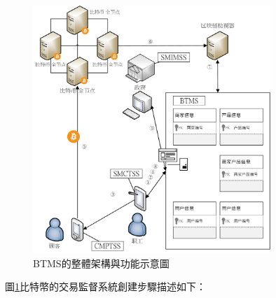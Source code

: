 	\begin{figure}[!htbp]
		\centering
		\includegraphics[width = 0.8\textwidth]{fig4.jpg}
		\caption{BTMS的整體架構與功能示意圖}\label{fig4}
	\end{figure}

	圖\ref{fig4}比特幣的交易監督系統創建步驟描述如下：

